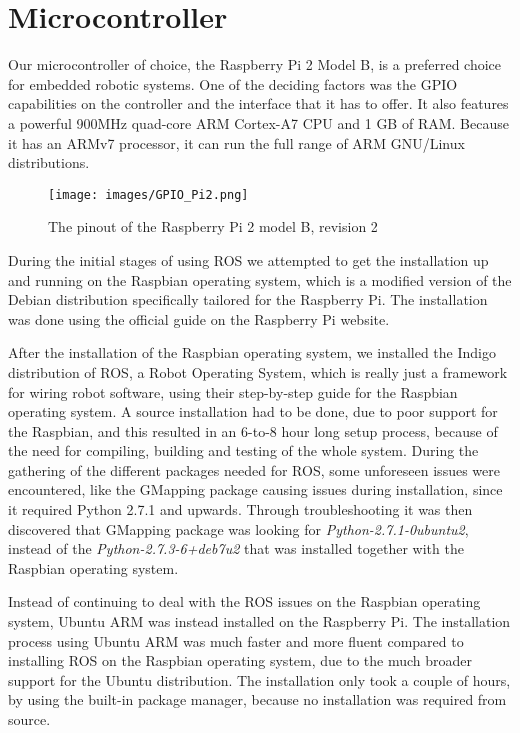 \pagebreak
\section{Microcontroller}

Our microcontroller of choice, the Raspberry Pi 2 Model B, is a preferred choice for embedded robotic systems. One of the deciding factors was the GPIO capabilities on the controller and the interface that it has to offer. It also features a powerful 900MHz quad-core ARM Cortex-A7 CPU and 1 GB of RAM. Because it has an ARMv7 processor, it can run the full range of ARM GNU/Linux distributions\cite{raspispecs}.

\begin{figure}[H]
	\centering
	\texttt{[image: images/GPIO\_Pi2.png]}
	\caption{The pinout of the Raspberry Pi 2 model B, revision 2}
	\label{fig:gpioraspbi2}
\end{figure}

During the initial stages of using ROS we attempted to get the installation up and running on the Raspbian operating system, which is a modified version of the Debian distribution specifically tailored for the Raspberry Pi. The installation was done using the official guide on the Raspberry Pi website\cite{raspiinstall}.

After the installation of the Raspbian operating system, we installed the Indigo distribution of ROS, a Robot Operating System, which is really just a framework for wiring robot software, using their step-by-step guide for the Raspbian operating system\cite{indigoins}.
A source installation had to be done, due to poor support for the Raspbian, and this resulted in an 6-to-8 hour long setup process, because of the need for compiling, building and testing of the whole system. 
During the gathering of the different packages needed for ROS, some unforeseen issues were encountered, like the GMapping package causing issues during installation, since it required Python 2.7.1 and upwards. Through troubleshooting it was then discovered that GMapping package was looking for \textit{Python-2.7.1-0ubuntu2}, instead of the \textit{Python-2.7.3-6+deb7u2} that was installed together with the Raspbian operating system.

Instead of continuing to deal with the ROS issues on the Raspbian operating system, Ubuntu ARM was instead installed on the Raspberry Pi\cite{ubuntuins}.
The installation process using Ubuntu ARM was much faster and more fluent compared to installing ROS on the Raspbian operating system, due to the much broader support for the Ubuntu distribution. The installation only took a couple of hours, by using the built-in package manager, because no installation was required from source\cite{ubuntuROS}.

